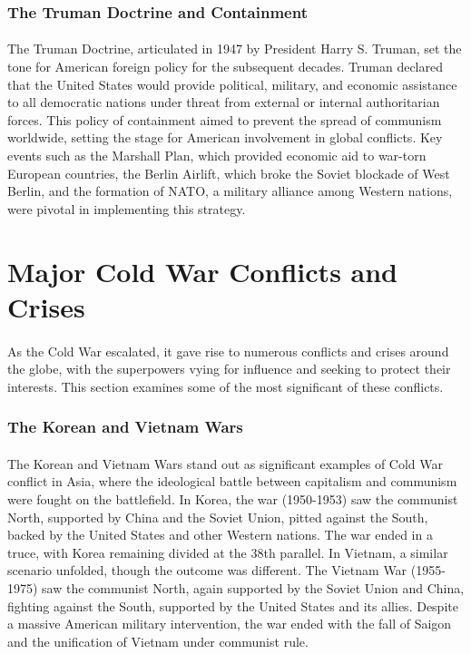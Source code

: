\documentclass{book}
\begin{document}
\subsubsection*{The Truman Doctrine and Containment}
\paragraph{}
The Truman Doctrine, articulated in 1947 by President Harry S. Truman, set the tone for American foreign policy for the subsequent decades. Truman declared that the United States would provide political, military, and economic assistance to all democratic nations under threat from external or internal authoritarian forces. This policy of containment aimed to prevent the spread of communism worldwide, setting the stage for American involvement in global conflicts. Key events such as the Marshall Plan, which provided economic aid to war-torn European countries, the Berlin Airlift, which broke the Soviet blockade of West Berlin, and the formation of NATO, a military alliance among Western nations, were pivotal in implementing this strategy. 

\section*{Major Cold War Conflicts and Crises}
\paragraph{}
As the Cold War escalated, it gave rise to numerous conflicts and crises around the globe, with the superpowers vying for influence and seeking to protect their interests. This section examines some of the most significant of these conflicts.

\subsubsection*{The Korean and Vietnam Wars}
\paragraph{}
The Korean and Vietnam Wars stand out as significant examples of Cold War conflict in Asia, where the ideological battle between capitalism and communism were fought on the battlefield. In Korea, the war (1950-1953) saw the communist North, supported by China and the Soviet Union, pitted against the South, backed by the United States and other Western nations. The war ended in a truce, with Korea remaining divided at the 38th parallel. In Vietnam, a similar scenario unfolded, though the outcome was different. The Vietnam War (1955-1975) saw the communist North, again supported by the Soviet Union and China, fighting against the South, supported by the United States and its allies. Despite a massive American military intervention, the war ended with the fall of Saigon and the unification of Vietnam under communist rule. 
\end{document}
